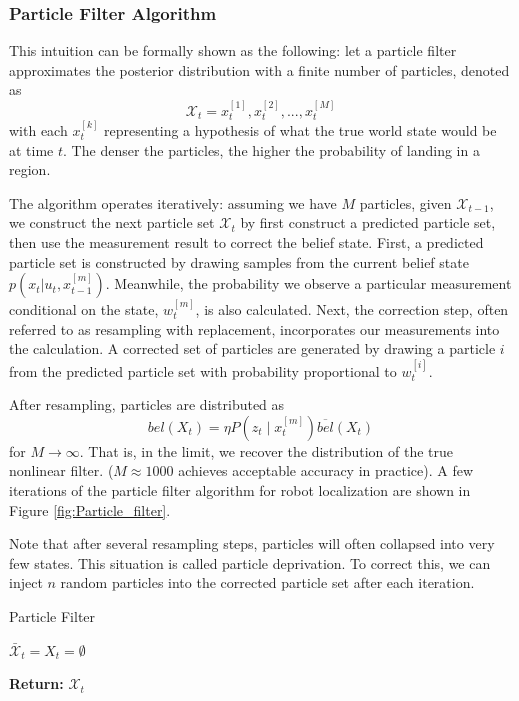 \documentclass[twoside]{article}
\begin{document}
\subsubsection{Particle Filter Algorithm}
This intuition can be formally shown as the following: let a particle filter approximates the posterior distribution with a finite number of particles, denoted as
\begin{equation}
	\mathcal{X}_t = x_t^{[1]}, x_t^{[2]},..., x_t^{[M]}
\end{equation}
with each $x_t^{[k]}$ representing a hypothesis of what the true world state would be at time $t$. The denser the particles, the higher the probability of landing in a region. 

The algorithm operates iteratively: assuming we have $M$ particles, given $\mathcal{X}_{t-1}$, we construct the next particle set $\mathcal{X}_t$ by first construct a predicted particle set, then use the measurement result to correct the belief state. First, a predicted particle set is constructed by drawing samples from the current belief state $p(x_t| u_t, x^{[m]}_{t-1})$. Meanwhile, the probability we observe a particular measurement conditional on the state, $w^{[m]}_t$, is also calculated. Next, the correction step, often referred to as resampling with replacement, incorporates our measurements into the calculation. A corrected set of particles are generated by drawing a particle $i$ from the predicted particle set with probability proportional to $w^{[i]}_t$. 

After resampling, particles are distributed as
\begin{equation}
	bel(X_t) = \eta P(z_t \mid x_t^{[m]})\overline{bel}(X_t)
\end{equation}
for $M \rightarrow \infty$. That is, in the limit, we recover the distribution of the true nonlinear filter. ($M \approx 1000$ achieves acceptable accuracy in practice). A few iterations of the particle filter algorithm for robot localization are shown in Figure \ref{fig:Particle_filter}.

Note that after several resampling steps, particles will often collapsed into very few states. This situation is called particle deprivation. To correct this, we can inject $n$ random particles into the corrected particle set after each iteration. 

\begin{algorithm}[H]
\caption{Particle Filter}
$\bar{\mathcal{X}}_t = X_t = \emptyset$\;

{\bf Return: }$\mathcal{X}_t$
\end{algorithm}
\end{document}
